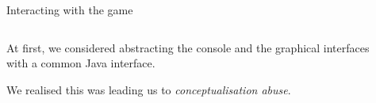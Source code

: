 \documentclass{beamer}
\begin{document}
  \begin{frame}{Interacting with the game}


  \begin{minipage}{\textwidth}
  \begin{columns}[T]
    \begin{column}{0.6\textwidth}


      At first, we considered abstracting the console and the graphical interfaces with a common Java interface.

      \vspace{1em}
      
      We realised this was leading us to \textit{conceptualisation abuse}.

    \end{column}
    \begin{column}{0.4\textwidth}


    \end{column}
  \end{columns}
  \end{minipage}

  \end{frame}
\end{document}
